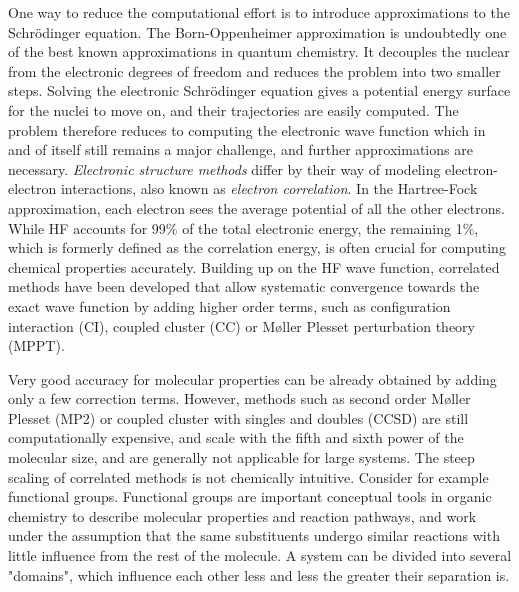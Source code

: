 One way to reduce the computational effort is to introduce approximations to the Schrödinger equation. The Born-Oppenheimer approximation  is undoubtedly one of the best known approximations in quantum chemistry. It decouples the nuclear from the electronic degrees of freedom and reduces the problem into two smaller steps. Solving the electronic Schrödinger equation gives a potential energy surface for the nuclei to move on, and their trajectories are easily computed. The problem therefore reduces to computing the electronic wave function which in and of itself still remains a major challenge, and further approximations are necessary. \emph{Electronic structure methods} differ by their way of modeling electron-electron interactions, also known as \emph{electron correlation}. In the Hartree-Fock approximation, each electron sees the average potential of all the other electrons. While HF accounts for 99\% of the total electronic energy, the remaining 1\%, which is formerly defined as the correlation energy, is often crucial for computing chemical properties accurately. Building up on the HF wave function, correlated methods have been developed that allow systematic convergence towards the exact wave function by adding higher order terms, such as configuration interaction (CI), coupled cluster (CC) or M{\o}ller Plesset perturbation theory (MPPT). 

Very good accuracy for molecular properties can be already obtained by adding only a few correction terms. However, methods such as second order M{\o}ller Plesset (MP2) or coupled cluster with singles and doubles (CCSD) are still computationally expensive, and scale with the fifth and sixth power of the molecular size, and are generally not applicable for large systems. The steep scaling of correlated methods is not chemically intuitive. Consider for example functional groups. Functional groups are important conceptual tools in organic chemistry to describe molecular properties and reaction pathways, and work under the assumption that the same substituents undergo similar reactions with little influence from the rest of the molecule. A system can be divided into several "domains", which influence each other less and less the greater their separation is. 

